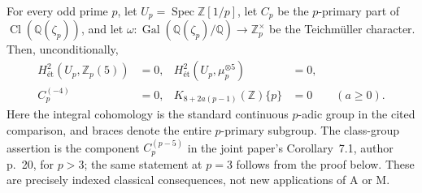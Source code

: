 \begin{proposition}
For every odd prime $p$, let $U_p=\operatorname{Spec}\mathbb Z[1/p]$,
let $C_p$ be the $p$-primary part of
$\operatorname{Cl}(\mathbb Q(\zeta_p))$, and let
$\omega:\operatorname{Gal}(\mathbb Q(\zeta_p)/\mathbb Q)
\to\mathbb Z_p^\times$ be the Teichmüller character.
Then, unconditionally,
\begin{align*}
 H^2_{\text{ét}}(U_p,\mathbb Z_p(5))&=0,
 &H^2_{\text{ét}}(U_p,\mu_p^{\otimes5})&=0,\\
 C_p^{(-4)}&=0,
 &K_{8+2a(p-1)}(\mathbb Z)\{p\}&=0\qquad(a\ge0).
\end{align*}
Here the integral cohomology is the standard continuous
$p$-adic group in the cited comparison, and braces denote
the entire $p$-primary subgroup.  The class-group assertion
is the component $C_p^{(p-5)}$ in the joint paper's
Corollary~7.1, author p.~20, for $p>3$; the same statement
at $p=3$ follows from the proof below.  These are precisely
indexed classical consequences, not new applications of A or M.
\end{proposition}

